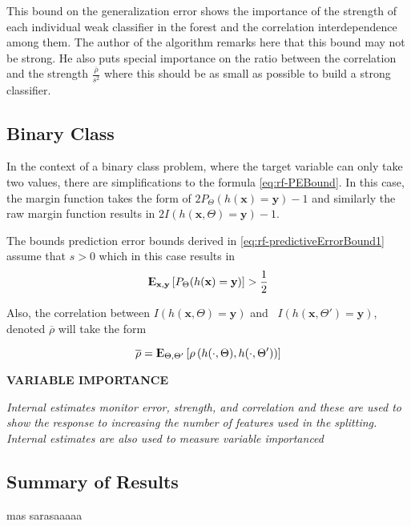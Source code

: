 \documentclass{article}%
\newcommand{\Expect}{{\rm I\kern-.3em E}}
\theoremstyle{definition}
\begin{document}
This bound on the generalization error shows the importance of the strength of each individual weak classifier in the forest and the correlation interdependence among them. The author \cite{breiman-randomforests} of the algorithm remarks here that this bound may not be strong. He also puts special importance on the ratio between the correlation and the strength $\frac{\overline{\rho}}{s^2}$ where this should be as small as possible to build a strong classifier.	 


\subsection{Binary Class}
In the context of a binary class problem, where the target variable can only take two values, there are simplifications to the formula \ref{eq:rf-PEBound}. In this case, the margin function takes the form of $2 P_{\Theta}(h(\textbf{x}) = \textbf{y}) -1$ and similarly the raw margin function results in $2 I(h(\textbf{x}, \Theta) = \textbf{y}) -1$. 

The bounds prediction error bounds derived in \ref{eq:rf-predictiveErrorBound1} assume that $s >0$ which in this case results in
$$ \Expect_{\textbf{x},\textbf{y}} \left[ P_{\Theta}(h(\textbf{x}) = \textbf{y}) \right] > \frac{1}{2} $$

Also, the correlation between $I(h(\textbf{x}, \Theta) = \textbf{y})$ and \  $I(h(\textbf{x}, \Theta') = \textbf{y})$, denoted $\overline{\rho}$ will take the form

$$ \overline{\rho} =  \Expect_{\Theta,\Theta'} \left[ \rho \left( h(\cdot{},\Theta) ,h(\cdot{},\Theta') \right)   \right] $$


\textbf{VARIABLE IMPORTANCE}

\textit{Internal estimates monitor error, strength, and correlation and these are used to show
	the response to increasing the number of features used in the splitting. Internal estimates are also used to measure variable importanced}

\subsection{Summary of Results}

mas sarasaaaaa
\end{document}
